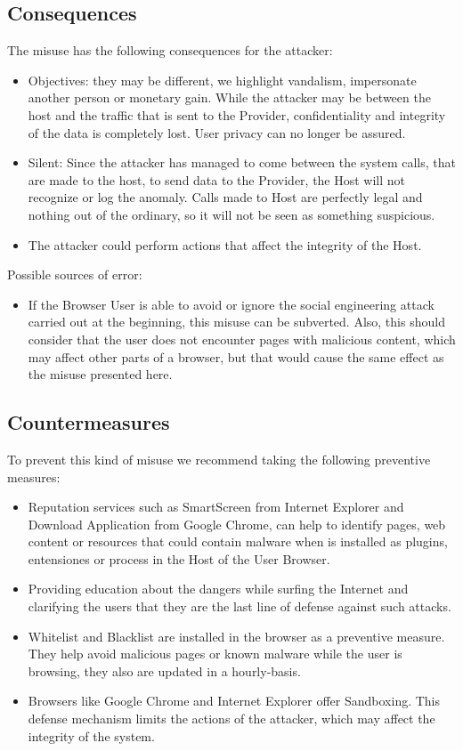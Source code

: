 \documentclass{sig-alternate-05-2015}
\begin{document}
\subsection*{Consequences}
  The misuse has the following consequences for the attacker:
  \begin{itemize}
    \item Objectives: they may be different, we highlight vandalism, impersonate another person or monetary gain. While the attacker may be between the host and the traffic that is sent to the Provider, confidentiality and integrity of the data is completely lost. User privacy can no longer be assured.
    \item Silent: Since the attacker has managed to come between the system calls, that are made to the host, to send data to the Provider, the Host will not recognize or log the anomaly. Calls made to Host are perfectly legal and nothing out of the ordinary, so it will not be seen as something suspicious.
    \item The attacker could perform actions that affect the integrity of the Host.
  \end{itemize}
  Possible sources of error:
  \begin{itemize}
    \item If the Browser User is able to avoid or ignore the social engineering attack carried out at the beginning, this misuse can be subverted. Also, this should consider that the user does not encounter pages with malicious content, which may affect other parts of a browser, but that would cause the same effect as the misuse presented here.
  \end{itemize}

\subsection*{Countermeasures} 
  To prevent this kind of misuse we recommend taking the following preventive measures:
  \begin{itemize}
    \item Reputation services such as SmartScreen \cite{Colvin2010} from Internet Explorer and Download Application \cite{Rajab2013} from Google Chrome, can help to identify pages, web content or resources that could contain malware when is installed as plugins, entensiones or process in the Host of the User Browser.
    \item Providing education about the dangers while surfing the Internet and clarifying the users that they are the last line of defense against such attacks.
    \item Whitelist and Blacklist are installed in the browser as a preventive measure. They help avoid malicious pages or known malware while the user is browsing, they also are updated in a hourly-basis.
    \item Browsers like Google Chrome and Internet Explorer offer Sandboxing. This defense mechanism limits the actions of the attacker, which may affect the integrity of the system.
  \end{itemize}
\end{document}
